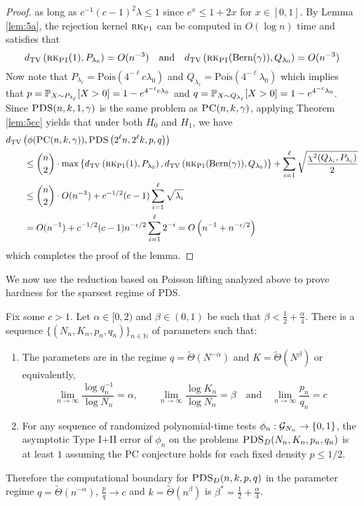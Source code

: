 \begin{proof}
as long as $c^{-1}(c-1)^2 \lambda \le 1$ since $e^x \le 1 + 2x$ for $x \in [0, 1]$. By Lemma \ref{lem:5a}, the rejection kernel $\textsc{rk}_{\text{P1}}$ can be computed in $O(\log n)$ time and satisfies that
$$d_{\text{TV}}\left(\textsc{rk}_{\text{P1}}(1), P_{\lambda_0} \right) = O(n^{-3}) \quad \text{and} \quad d_{\text{TV}}\left(\textsc{rk}_{\text{P1}}(\text{Bern}(\gamma)), Q_{\lambda_0} \right) = O(n^{-3})$$
Now note that $P_{\lambda_\ell} = \text{Pois}(4^{-\ell}c\lambda_0)$ and $Q_{\lambda_\ell} = \text{Pois}(4^{-\ell}\lambda_0)$ which implies that $p = \mathbb{P}_{X \sim P_{\lambda_\ell}}[X > 0] = 1 - e^{4^{-\ell}c\lambda_0}$ and $q = \mathbb{P}_{X \sim Q_{\lambda_\ell}}[X > 0] = 1 - e^{4^{-\ell}\lambda_0}$. Since $\textsc{PDS}(n, k, 1, \gamma)$ is the same problem as $\textsc{PC}(n, k, \gamma)$, applying Theorem \ref{lem:5cc} yields that under both $H_0$ and $H_1$, we have
\begin{align*}
&d_{\text{TV}}\left( \phi(\textsc{PC}(n, k, \gamma)), \textsc{PDS}\left( 2^\ell n, 2^\ell k, p, q \right) \right) \\
&\quad \quad \le \binom{n}{2} \cdot \max\left\{ d_{\text{TV}}\left(\textsc{rk}_{\text{P1}}(1), P_{\lambda_0} \right), d_{\text{TV}}\left(\textsc{rk}_{\text{P1}}(\text{Bern}(\gamma)), Q_{\lambda_0} \right) \right\} + \sum_{i = 1}^\ell \sqrt{\frac{\chi^2(Q_{\lambda_i}, P_{\lambda_i})}{2}} \\
&\quad \quad \le \binom{n}{2} \cdot O(n^{-3}) + c^{-1/2} (c - 1) \sum_{i = 1}^\ell \sqrt{\lambda_i} \\
&\quad \quad = O(n^{-1}) + c^{-1/2} (c - 1) n^{-\epsilon/2} \sum_{i = 1}^\ell 2^{-i} = O\left(n^{-1} + n^{-\epsilon/2}\right)
\end{align*}
which completes the proof of the lemma.
\end{proof}

We now use the reduction based on Poisson lifting analyzed above to prove hardness for the sparsest regime of PDS.

\begin{theorem}
Fix some $c > 1$. Let $\alpha \in [0, 2)$ and $\beta \in (0, 1)$ be such that $\beta < \frac{1}{2} + \frac{\alpha}{4}$. There is a sequence $\{ (N_n, K_n, p_n, q_n) \}_{n \in \mathbb{N}}$ of parameters such that:
\begin{enumerate}
\item The parameters are in the regime $q = \tilde{\Theta}(N^{-\alpha})$ and $K = \tilde{\Theta}(N^\beta)$ or equivalently,
$$\lim_{n \to \infty} \frac{\log q_n^{-1}}{\log N_n} = \alpha, \quad \quad \lim_{n \to \infty} \frac{\log K_n}{\log N_n} = \beta \quad \text{and} \quad \lim_{n \to \infty} \frac{p_n}{q_n} = c$$
\item For any sequence of randomized polynomial-time tests $\phi_n : \mathcal{G}_{N_n} \to \{0, 1\}$, the asymptotic Type I$+$II error of $\phi_n$ on the problems $\textsc{PDS}_D(N_n, K_n, p_n, q_n)$ is at least $1$ assuming the PC conjecture holds for each fixed density $p \le 1/2$.
\end{enumerate}
Therefore the computational boundary for $\textsc{PDS}_D(n, k, p, q)$ in the parameter regime $q = \tilde{\Theta}(n^{-\alpha})$, $\frac{p}{q} \to c$ and $k = \tilde{\Theta}(n^\beta)$ is $\beta^* = \frac{1}{2} + \frac{\alpha}{4}$.
\end{theorem}


